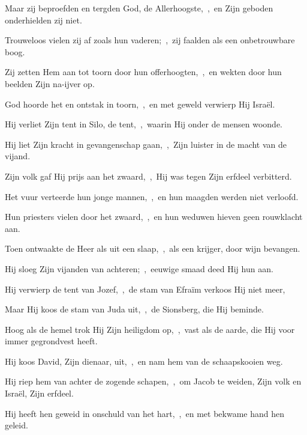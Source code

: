 \documentclass[12pt,twoside,a5paper]{article}
\begin{document}
\begin{halfparskip}

  Maar zij beproefden en tergden God, de Allerhoogste,~\sep\ en Zijn geboden onderhielden zij niet.

  Trouweloos vielen zij af zoals hun vaderen;~\sep\ zij faalden als een onbetrouwbare boog.

  Zij zetten Hem aan tot toorn door hun offerhoogten,~\sep\ en wekten door hun beelden Zijn na-ijver op.

  God hoorde het en ontstak in toorn,~\sep\ en met geweld verwierp Hij Israël.

  Hij verliet Zijn tent in Silo, de tent,~\sep\ waarin Hij onder de mensen woonde.

  Hij liet Zijn kracht in gevangenschap gaan,~\sep\ Zijn luister in de macht van de vijand.

  Zijn volk gaf Hij prijs aan het zwaard,~\sep\ Hij was tegen Zijn erfdeel verbitterd.

  Het vuur verteerde hun jonge mannen,~\sep\ en hun maagden werden niet verloofd.

  Hun priesters vielen door het zwaard,~\sep\ en hun weduwen hieven geen rouwklacht aan.
\end{halfparskip}

\begin{halfparskip}

  Toen ontwaakte de Heer als uit een slaap,~\sep\ als een krijger, door wijn bevangen.

  Hij sloeg Zijn vijanden van achteren;~\sep\ eeuwige smaad deed Hij hun aan.

  Hij verwierp de tent van Jozef,~\sep\ de stam van Efraïm verkoos Hij niet meer,

  Maar Hij koos de stam van Juda uit,~\sep\ de Sionsberg, die Hij beminde.

  Hoog als de hemel trok Hij Zijn heiligdom op,~\sep\ vast als de aarde, die Hij voor immer gegrondvest heeft.

  Hij koos David, Zijn dienaar, uit,~\sep\ en nam hem van de schaapskooien weg.

  Hij riep hem van achter de zogende schapen,~\sep\ om Jacob te weiden, Zijn volk en Israël, Zijn erfdeel.

  Hij heeft hen geweid in onschuld van het hart,~\sep\ en met bekwame hand hen geleid.
\end{halfparskip}
\end{document}
